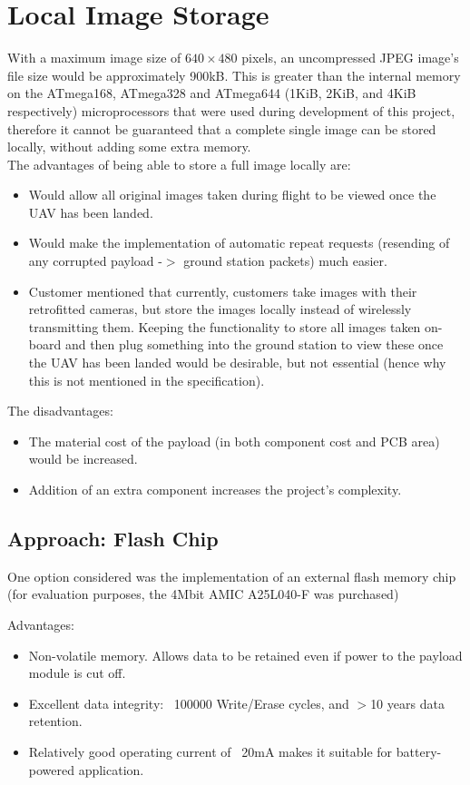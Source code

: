 
\section{Local Image Storage}

With a maximum image size of $640\times480$ pixels, an uncompressed JPEG 
image's file size would be approximately 900kB.
This is greater than the internal memory on the ATmega168, ATmega328 and 
ATmega644 (1KiB, 2KiB, and 4KiB respectively) microprocessors that were used 
during development of this project, therefore it cannot be guaranteed that a 
complete single image can be stored locally, without adding some extra memory.
\\
The advantages of being able to store a full image locally are:
\begin{itemize}
\item Would allow all original images taken during flight to be viewed once 
the UAV has been landed.
\item Would make the implementation of automatic repeat requests (resending of 
any corrupted payload -$>$ ground station packets) much easier.
\item Customer mentioned that currently, customers take images with their 
retrofitted cameras, but store the images locally instead of wirelessly 
transmitting them. Keeping the functionality to store all images taken 
on-board and then plug something into the ground station to view these once 
the UAV has been landed would be desirable, but not essential (hence why this 
is not mentioned in the specification).
\end{itemize}

The disadvantages:
\begin{itemize}
\item The material cost of the payload (in both component cost and PCB area) 
would be increased.
\item Addition of an extra component increases the project's complexity.
\end{itemize}

\subsection{Approach: Flash Chip}

One option considered was the implementation of an external flash memory chip 
(for evaluation purposes, the 4Mbit AMIC A25L040-F was purchased)

Advantages:
\begin{itemize}
\item Non-volatile memory. Allows data to be retained even if power to the payload module is cut off.
\item Excellent data integrity: ~100000 Write/Erase cycles, and $>$10 years data retention.
\item Relatively good operating current of ~20mA makes it suitable for battery-powered application.
\end{itemize}

